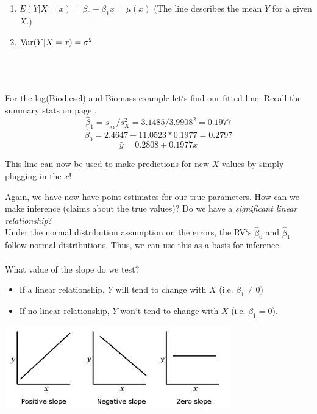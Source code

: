 ~\\~\\
\begin{enumerate}
\item $E(Y|X=x)=\beta_0 + \beta_1 x = \mu(x)$ (The line describes the mean $Y$ for a given $X$.)
\item $\mbox{Var}(Y|X=x)=\sigma^2$
\end{enumerate}

~\\~\\~\\
For the log(Biodiesel) and Biomass example let`s find our fitted line.  Recall the summary stats on page \pageref{bio}.\\
$$\hat\beta_1 = s_{_{XY}}/s_{X}^2 = 3.1485/3.9908^2 =  0.1977$$
$$\hat\beta_0 = 2.4647 - 11.0523*0.1977 = 0.2797$$
$$\hat{y} = 0.2808 + 0.1977x$$

This line can now be used to make predictions for new $X$ values by simply plugging in the $x$!\\

\newpage

Again, we have now have point estimates for our true parameters.  How can we make inference (claims about the true values)?  Do we have a \textit{significant linear relationship}?\\
Under the normal distribution assumption on the errors, the RV`s $\hat\beta_0$ and $\hat\beta_1$ follow normal distributions.  Thus, we can use this as a basis for inference.\\~\\

What value of the slope do we test?
\begin{itemize}
\item If a linear relationship, $Y$ will tend to change with $X$ (i.e. $\beta_1 \ne 0$)
\item If no linear relationship, $Y$ won`t tend to change with $X$ (i.e. $\beta_1 = 0$).
\end{itemize}

\begin{center}
\includegraphics{SLR1}
\end{center}

